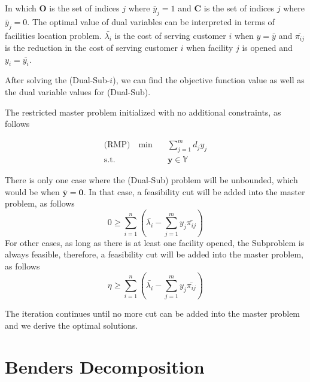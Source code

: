             In which $\mathbf{O}$ is the set of indices $j$ where $\bar{y}_j = 1$ and $\mathbf{C}$ is the set of indices $j$ where $\bar{y}_j = 0$. The optimal value of dual variables can be interpreted in terms of facilities location problem. $\bar{\lambda_i}$ is the cost of serving customer $i$ when $y = \bar{y}$ and $\bar{\pi_{ij}}$ is the reduction in the cost of serving customer $i$ when facility $j$ is opened and $y_i = \bar{y_i}$.

            After solving the (Dual-Sub-$i$), we can find the objective function value as well as the dual variable values for (Dual-Sub). 

            The restricted master problem initialized with no additional constraints, as follows

            \begin{align*}
                \text{(RMP)} \quad \min \quad & \sum_{j = 1}^m d_j y_j\\
                \text{s.t.} \quad & \mathbf{y} \in \mathbb{Y}
            \end{align*}

            There is only one case where the (Dual-Sub) problem will be unbounded, which would be when $\bar{\mathbf{y}} = \mathbf{0}$. In that case, a feasibility cut will be added into the master problem, as follows
            \begin{equation}
                0 \ge \sum_{i=1}^n (\bar{\lambda_i} - \sum_{j = 1}^m y_j \bar{\pi_{ij}})
            \end{equation}
            For other cases, as long as there is at least one facility opened, the Subproblem is always feasible, therefore, a feasibility cut will be added into the master problem, as follows
            \begin{equation*}
                \eta \ge \sum_{i=1}^n (\bar{\lambda_i} - \sum_{j = 1}^m y_j \bar{\pi_{ij}})
            \end{equation*}

            The iteration continues until no more cut can be added into the master problem and we derive the optimal solutions.

    \section{Benders Decomposition}
